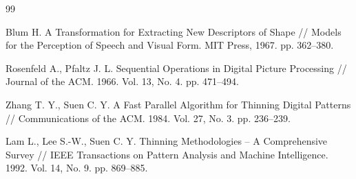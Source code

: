 \documentclass[12pt,a4paper]{article}
\begin{document}
\begin{thebibliography}{99}
	
	Blum H.
	A Transformation for Extracting New Descriptors of Shape //
	Models for the Perception of Speech and Visual Form.
	MIT Press, 1967.
	pp. 362--380.
	
	Rosenfeld A., Pfaltz J. L.
	Sequential Operations in Digital Picture Processing //
	Journal of the ACM.
	1966.
	Vol. 13, No. 4.
	pp. 471--494.
	
	Zhang T. Y., Suen C. Y.
	A Fast Parallel Algorithm for Thinning Digital Patterns //
	Communications of the ACM.
	1984.
	Vol. 27, No. 3.
	pp. 236--239.
	
	Lam L., Lee S.-W., Suen C. Y.
	Thinning Methodologies -- A Comprehensive Survey //
	IEEE Transactions on Pattern Analysis and Machine Intelligence.
	1992.
	Vol. 14, No. 9.
	pp. 869--885.
	
\end{thebibliography}
\end{document}
